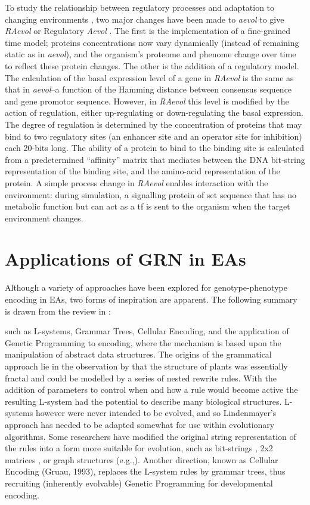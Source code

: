 To study the relationship between regulatory processes and adaptation to changing environments \parencite{Sanchez-Dehesa:2008uq}, two major changes have been made to \emph{aevol} to give \emph{RAevol} or Regulatory \emph{Aevol} \parencite{Beslon:2010zr,Sanchez-Dehesa:2008uq}. The first is the implementation of a fine-grained time model; proteins concentrations now vary dynamically (instead of remaining static as in \emph{aevol}), and the organism's proteome and phenome change over time to reflect these protein changes. The other is the addition of a regulatory model. The calculation of the basal expression level of a gene in \emph{RAevol} is the same as that in \emph{aevol}--a function of the Hamming distance between consensus sequence and gene promotor sequence. However, in \emph{RAevol} this level is modified by the action of regulation, either up-regulating or down-regulating the basal expression. The degree of regulation is determined by the concentration of proteins that may bind to two regulatory sites (an enhancer site and an operator site for inhibition) each 20-bits long. The ability of a protein to bind to the binding site is calculated from a predetermined ``affinity'' matrix that mediates between the DNA bit-string representation of the binding site, and the amino-acid representation of the protein. A simple process change in \emph{RAevol} enables interaction with the environment:  during simulation, a signalling protein of set sequence that has no metabolic function but can act as a \gls{tf} is sent to the organism when the target environment changes.

\chapter{Applications of GRN in EAs}\label{applications-of-grn-in-eas}

Although a variety of approaches have been explored for genotype-phenotype encoding in EAs, two forms of inspiration are apparent. The following summary is drawn from the review in \textcite{Stanley:2003fh}:

 such as L-systems, Grammar Trees, Cellular Encoding, and the application of Genetic Programming to encoding, where the mechanism is based upon the manipulation of abstract data structures. The origins of the grammatical approach lie in the observation by \textcite{Lindenmayer:1968nl} that the structure of plants was essentially fractal and could be modelled by a series of nested rewrite rules. With the addition of parameters to control when and how a rule would become active the resulting L-system had the potential to describe many biological structures. L-systems however were never intended to be evolved, and so Lindenmayer's approach has needed to be adapted somewhat for use within evolutionary algorithms. Some researchers have modified the original string representation of the rules into a form more suitable for evolution, such as bit-strings \parencite{Boers:1992cn}, 2x2 matrices \parencite{Kitano:1990fs}, or graph structures (e.g.,\cite{Sims:1994uq}). Another direction, known as Cellular Encoding (Gruau, 1993), replaces the L-system rules by grammar trees, thus recruiting (inherently evolvable) Genetic Programming for developmental encoding.

